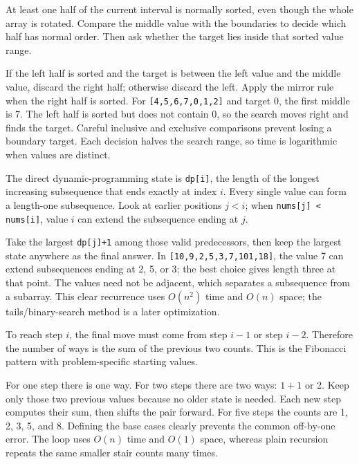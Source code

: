 \expandafter\def\csname sourcewalkthrough@71\endcsname{%
At least one half of the current interval is normally sorted, even though the
whole array is rotated. Compare the middle value with the boundaries to decide
which half has normal order. Then ask whether the target lies inside that
sorted value range.

If the left half is sorted and the target is between the left value and the
middle value, discard the right half; otherwise discard the left. Apply the
mirror rule when the right half is sorted. For \texttt{[4,5,6,7,0,1,2]} and
target 0, the first middle is 7. The left half is sorted but does not contain
0, so the search moves right and finds the target. Careful inclusive and
exclusive comparisons prevent losing a boundary target. Each decision halves
the search range, so time is logarithmic when values are distinct.}

\expandafter\def\csname sourcewalkthrough@72\endcsname{%
The direct dynamic-programming state is \texttt{dp[i]}, the length of the
longest increasing subsequence that ends exactly at index \(i\). Every single
value can form a length-one subsequence. Look at earlier positions \(j<i\);
when \texttt{nums[j] < nums[i]}, value \(i\) can extend the subsequence ending
at \(j\).

Take the largest \texttt{dp[j]+1} among those valid predecessors, then keep the
largest state anywhere as the final answer. In \texttt{[10,9,2,5,3,7,101,18]},
the value 7 can extend subsequences ending at 2, 5, or 3; the best choice gives
length three at that point. The values need not be adjacent, which separates a
subsequence from a subarray. This clear recurrence uses \(O(n^2)\) time and
\(O(n)\) space; the tails/binary-search method is a later optimization.}

\expandafter\def\csname sourcewalkthrough@73\endcsname{%
To reach step \(i\), the final move must come from step \(i-1\) or step
\(i-2\). Therefore the number of ways is the sum of the previous two counts.
This is the Fibonacci pattern with problem-specific starting values.

For one step there is one way. For two steps there are two ways: \(1+1\) or
2. Keep only those two previous values because no older state is needed. Each
new step computes their sum, then shifts the pair forward. For five steps the
counts are 1, 2, 3, 5, and 8. Defining the base cases clearly prevents the
common off-by-one error. The loop uses \(O(n)\) time and \(O(1)\) space,
whereas plain recursion repeats the same smaller stair counts many times.}

